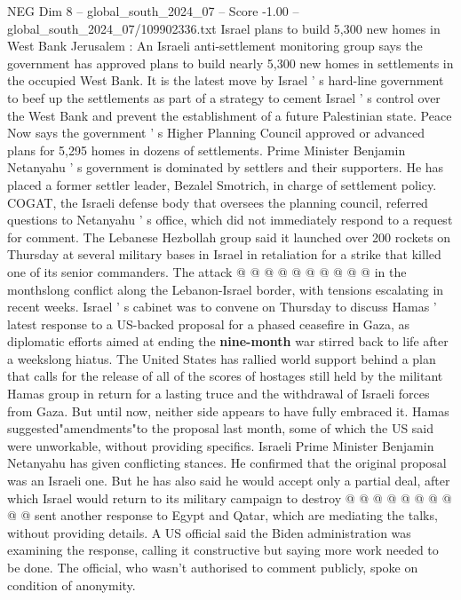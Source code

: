 \begin{textsample}{NEG Dim 8 – global\_south\_2024\_07 – Score -1.00 – global\_south\_2024\_07/109902336.txt}  \label{ex:f8_neg_109}
Israel plans to build 5,300 new homes in West Bank Jerusalem : An Israeli anti-settlement monitoring group says the government has approved plans to build nearly 5,300 new homes in settlements in the occupied West Bank.
It is the latest move by Israel ' s hard-line government to beef up the settlements as part of a strategy to cement Israel ' s control over the West Bank and prevent the establishment of a future Palestinian state.
Peace Now says the government ' s Higher Planning Council approved or advanced plans for 5,295 homes in dozens of settlements.
Prime Minister Benjamin Netanyahu ' s government is dominated by settlers and their supporters.
He has placed a former settler leader, Bezalel Smotrich, in charge of settlement policy.
COGAT, the Israeli defense body that oversees the planning council, referred questions to Netanyahu ' s office, which did not immediately respond to a request for comment.
The Lebanese Hezbollah group said it launched over 200 rockets on Thursday at several military bases in Israel in retaliation for a strike that killed one of its senior commanders.
The attack @ @ @ @ @ @ @ @ @ @ in the monthslong conflict along the Lebanon-Israel border, with tensions escalating in recent weeks.
Israel ' s cabinet was to convene on Thursday to discuss Hamas ' latest response to a US-backed proposal for a phased ceasefire in Gaza, as diplomatic efforts aimed at ending the \textbf{nine-month} war stirred back to life after a weekslong hiatus.
The United States has rallied world support behind a plan that calls for the release of all of the scores of hostages still held by the militant Hamas group in return for a lasting truce and the withdrawal of Israeli forces from Gaza.
But until now, neither side appears to have fully embraced it.
Hamas suggested"amendments"to the proposal last month, some of which the US said were unworkable, without providing specifics.
Israeli Prime Minister Benjamin Netanyahu has given conflicting stances.
He confirmed that the original proposal was an Israeli one.
But he has also said he would accept only a partial deal, after which Israel would return to its military campaign to destroy @ @ @ @ @ @ @ @ @ @ sent another response to Egypt and Qatar, which are mediating the talks, without providing details.
A US official said the Biden administration was examining the response, calling it constructive but saying more work needed to be done.
The official, who wasn't authorised to comment publicly, spoke on condition of anonymity.

\end{textsample}
